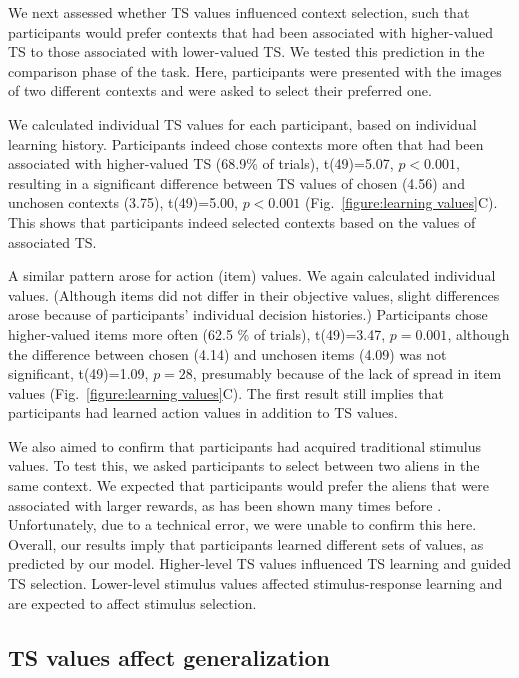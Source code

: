 \documentclass[10pt, letterpaper]{article}
\begin{document}
We next assessed whether TS values influenced context selection, such that participants would prefer contexts that had been associated with higher-valued TS to those associated with lower-valued TS. We tested this prediction in the comparison phase of the task. Here, participants were presented with the images of two different contexts and were asked to select their preferred one. 

We calculated individual TS values for each participant, based on individual learning history. Participants indeed chose contexts more often that had been associated with higher-valued TS (68.9\% of trials), t(49)=5.07, $p<0.001$, resulting in a significant difference between TS values of chosen (4.56) and unchosen contexts (3.75), t(49)=5.00, $p<0.001$ (Fig.~\ref{figure:learning values}C). This shows that participants indeed selected contexts based on the values of associated TS.

A similar pattern arose for action (item) values. We again calculated individual values. (Although items did not differ in their objective values, slight differences arose because of participants' individual decision histories.) Participants chose higher-valued items more often (62.5 \% of trials), t(49)=3.47, $p=0.001$, although the difference between chosen (4.14) and unchosen items (4.09) was not significant, t(49)=1.09, $p=28$, presumably because of the lack of spread in item values (Fig.~\ref{figure:learning values}C). The first result still implies that participants had learned action values in addition to TS values.

We also aimed to confirm that participants had acquired traditional stimulus values. To test this, we asked participants to select between two aliens in the same context. We expected that participants would prefer the aliens that were associated with larger rewards, as has been shown many times before \cite{frank_by_2004}. Unfortunately, due to a technical error, we were unable to confirm this here. Overall, our results imply that participants learned different sets of values, as predicted by our model. Higher-level TS values influenced TS learning and guided TS selection. Lower-level stimulus values affected stimulus-response learning and are expected to affect stimulus selection.


\subsection{TS values affect generalization}
\end{document}
